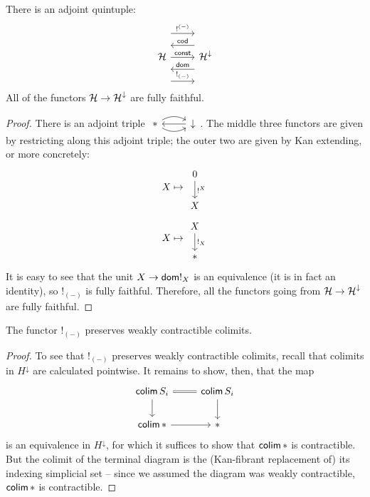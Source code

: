 \begin{prop}
  There is an adjoint quintuple:
  \[
    \begin{tikzcd}
      \Ha \arrow[r, "\const"] \arrow[r, leftarrow, shift left = 5,
      "\term{cod}"] \arrow[r, leftarrow, shift right = 5, "\term{dom}"]
      \arrow[r, shift left = 10, "!^{(-)}"]  \arrow[r, shift right = 10, "!_{(-)}"] & \Ha^{\downarrow}
    \end{tikzcd}
  \]
  All of the functors $\operatorname{\mathcal{H}} \to \operatorname{\mathcal{H}}^{\downarrow}$ are fully faithful.
\end{prop}
\begin{proof}
There is an adjoint triple $\begin{tikzcd} \ast \arrow[r,leftarrow] \arrow[r,
  bend left] \arrow[r, bend right] & \downarrow \end{tikzcd}$. The middle three
functors are given by restricting along this adjoint triple; the outer two are
given by Kan extending, or more concretely:
  $$X \mapsto \begin{tikzcd} 0 \arrow[d, "!^X"] \\ X \end{tikzcd}$$
  $$X \mapsto \begin{tikzcd} X \arrow[d, "!_X"] \\ \ast \end{tikzcd}$$
It is easy to see that the unit $X \to \mathsf{{dom}} !_{X}$ is an equivalence (it is in
fact an identity), so $!_{(-)}$ is fully faithful. Therefore, all the functors
going from $\operatorname{\mathcal{H}} \to \operatorname{\mathcal{H}}^{\downarrow}$ are fully faithful.
\end{proof}

\begin{prop}
  The functor $!_{(-)}$ preserves weakly contractible colimits.
\end{prop}
\begin{proof}
  To see that $!_{(-)}$ preserves weakly contractible colimits, recall that colimits in $H^{\downarrow}$ are calculated pointwise. It remains to show, then, that the map
  \[
    \begin{tikzcd}
    \colim S_i \arrow[r, equals] \arrow[d] & \colim S_i \arrow[d] \\
    \colim \ast \arrow[r] & \ast 
    \end{tikzcd}
  \]
  is an equivalence in $H^{\downarrow}$, for which it suffices to show that $\operatorname{\mathsf{colim}} \ast$ is contractible. But the colimit of the terminal diagram is the (Kan-fibrant replacement of) its indexing simplicial set -- since we assumed the diagram was weakly contractible, $\operatorname{\mathsf{colim}} \ast$ is contractible.
\end{proof}


